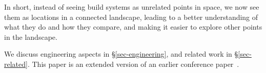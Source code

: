 In short, instead of seeing build systems as unrelated points in space, we now
see them as locations in a connected landscape, leading to a better
understanding of what they do and how they compare, and making it easier to
explore other points in the landscape.

We discuss engineering aspects in \S\ref{sec-engineering}, and related
work in \S\ref{sec-related}. This paper is an extended version of an earlier
conference paper~\cite{mokhov2018buildsystems}.

